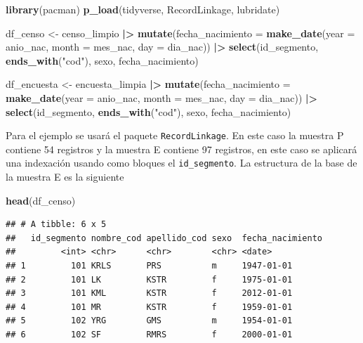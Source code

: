 \documentclass[
  12pt,
]{book}
\newenvironment{Shaded}{\begin{snugshade}}{\end{snugshade}}
\newcommand{\AttributeTok}[1]{\textcolor[rgb]{0.13,0.29,0.53}{#1}}
\newcommand{\FunctionTok}[1]{\textcolor[rgb]{0.13,0.29,0.53}{\textbf{#1}}}
\newcommand{\NormalTok}[1]{#1}
\newcommand{\OtherTok}[1]{\textcolor[rgb]{0.56,0.35,0.01}{#1}}
\newcommand{\SpecialCharTok}[1]{\textcolor[rgb]{0.81,0.36,0.00}{\textbf{#1}}}
\newcommand{\StringTok}[1]{\textcolor[rgb]{0.31,0.60,0.02}{#1}}
\begin{document}
\begin{Shaded}
\begin{Highlighting}[]
\FunctionTok{library}\NormalTok{(pacman)}
\FunctionTok{p\_load}\NormalTok{(tidyverse, RecordLinkage, lubridate)}

\NormalTok{df\_censo }\OtherTok{\textless{}{-}}\NormalTok{ censo\_limpio }\SpecialCharTok{|\textgreater{}} 
  \FunctionTok{mutate}\NormalTok{(}\AttributeTok{fecha\_nacimiento =} \FunctionTok{make\_date}\NormalTok{(}\AttributeTok{year =}\NormalTok{ anio\_nac, }\AttributeTok{month =}\NormalTok{ mes\_nac, }\AttributeTok{day =}\NormalTok{ dia\_nac)) }\SpecialCharTok{|\textgreater{}} 
    \FunctionTok{select}\NormalTok{(id\_segmento, }\FunctionTok{ends\_with}\NormalTok{(}\StringTok{"cod"}\NormalTok{), sexo, fecha\_nacimiento)}

\NormalTok{df\_encuesta }\OtherTok{\textless{}{-}}\NormalTok{ encuesta\_limpia }\SpecialCharTok{|\textgreater{}} 
    \FunctionTok{mutate}\NormalTok{(}\AttributeTok{fecha\_nacimiento =} \FunctionTok{make\_date}\NormalTok{(}\AttributeTok{year =}\NormalTok{ anio\_nac, }\AttributeTok{month =}\NormalTok{ mes\_nac, }\AttributeTok{day =}\NormalTok{ dia\_nac)) }\SpecialCharTok{|\textgreater{}} 
    \FunctionTok{select}\NormalTok{(id\_segmento, }\FunctionTok{ends\_with}\NormalTok{(}\StringTok{"cod"}\NormalTok{), sexo, fecha\_nacimiento)}
\end{Highlighting}
\end{Shaded}

Para el ejemplo se usará el paquete \texttt{RecordLinkage}. En este caso la muestra P contiene 54 registros y la muestra E contiene 97 registros, en este caso se aplicará una indexación usando como bloques el \texttt{id\_segmento}. La estructura de la base de la muestra E es la siguiente

\begin{Shaded}
\begin{Highlighting}[]
\FunctionTok{head}\NormalTok{(df\_censo)}
\end{Highlighting}
\end{Shaded}

\begin{verbatim}
## # A tibble: 6 x 5
##   id_segmento nombre_cod apellido_cod sexo  fecha_nacimiento
##         <int> <chr>      <chr>        <chr> <date>          
## 1         101 KRLS       PRS          m     1947-01-01      
## 2         101 LK         KSTR         f     1975-01-01      
## 3         101 KML        KSTR         f     2012-01-01      
## 4         101 MR         KSTR         f     1959-01-01      
## 5         102 YRG        GMS          m     1954-01-01      
## 6         102 SF         RMRS         f     2000-01-01
\end{verbatim}
\end{document}
